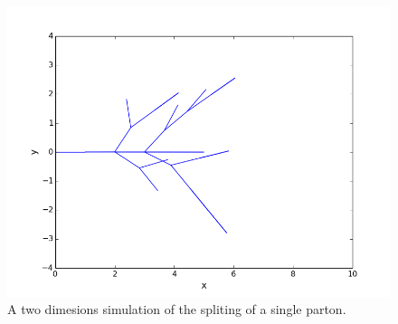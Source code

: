 %
%
\begin{figure}[hbtp]
\centering
\includegraphics[scale=.6]{images/2D_partonshower.png}
\caption{A two dimesions simulation of the spliting of a single parton.}\label{fig:2d}
\end{figure}

